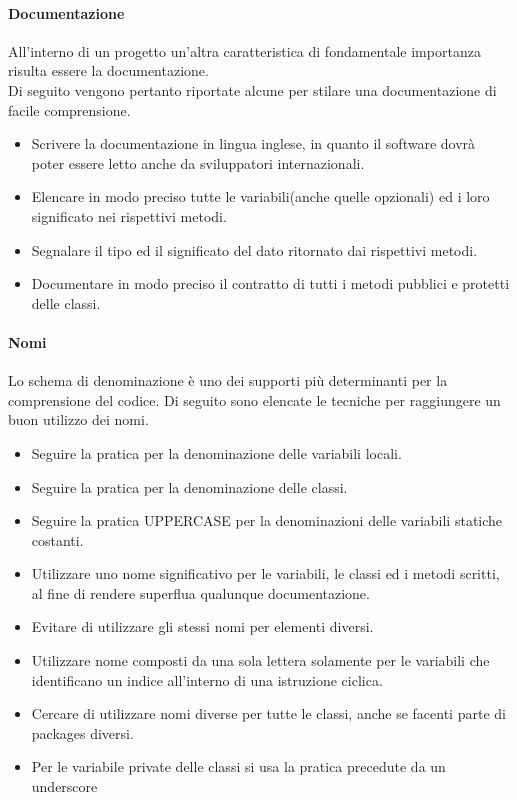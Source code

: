 \paragraph{Documentazione}
All'interno di un progetto  un'altra caratteristica di fondamentale importanza risulta essere la documentazione. \\
Di seguito vengono pertanto riportate alcune  per stilare una documentazione di facile comprensione.

\begin{itemize}
\item Scrivere la documentazione in lingua inglese, in quanto il software dovrà poter essere letto anche da sviluppatori internazionali.
\item Elencare in modo preciso tutte le variabili(anche quelle opzionali) ed i loro significato nei rispettivi metodi.
\item Segnalare il tipo ed il significato del dato ritornato dai rispettivi metodi.
\item Documentare in modo preciso il contratto di tutti i metodi pubblici e protetti delle classi.
\end{itemize}

\paragraph{Nomi}
Lo schema di denominazione è uno dei supporti più determinanti per la comprensione del codice.
Di seguito sono elencate le tecniche per raggiungere un buon utilizzo dei nomi.

\begin{itemize}
\item Seguire la pratica  per la denominazione delle variabili locali.
\item Seguire la pratica  per la denominazione delle classi.
\item Seguire la pratica UPPER\textunderscore CASE per la denominazioni delle variabili statiche costanti.
\item Utilizzare uno nome significativo per le variabili, le classi ed i metodi scritti, al fine di rendere superflua qualunque documentazione.
\item Evitare di utilizzare gli stessi nomi per elementi diversi.
\item Utilizzare nome composti da una sola lettera solamente per le variabili che identificano un indice all'interno di una istruzione ciclica.
\item Cercare di utilizzare nomi diverse per tutte le classi, anche se facenti parte di packages diversi.
\item Per le variabile private delle classi si usa la pratica  precedute da un underscore 
\end{itemize}

